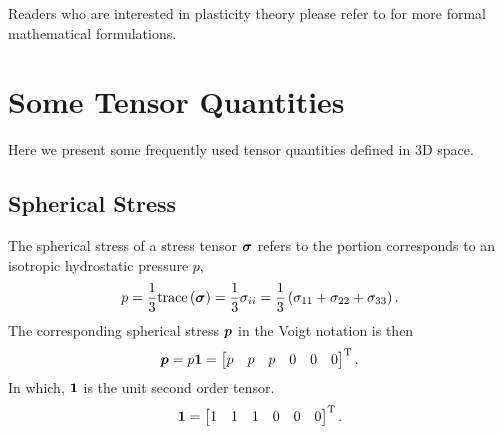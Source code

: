 Readers who are interested in plasticity theory please refer to \cite{Simo1998} for more formal mathematical formulations.
\section{Some Tensor Quantities}
Here we present some frequently used tensor quantities defined in 3D space.
\subsection{Spherical Stress}
The spherical stress of a stress tensor $\bm{\sigma}$ refers to the portion corresponds to an isotropic hydrostatic pressure $p$,
\begin{gather}
p=\dfrac{1}{3}\text{trace}\left(\bm{\sigma}\right)=\dfrac{1}{3}\sigma_{ii}=\dfrac{1}{3}\left(\sigma_{11}+\sigma_{22}+\sigma_{33}\right).
\end{gather}
The corresponding spherical stress $\bm{p}$ in the Voigt notation is then
\begin{gather}
\bm{p}=p\bm{1}=\begin{bmatrix}p&p&p&0&0&0\end{bmatrix}^{\mathrm{T}}.
\end{gather}
In which, $\bm{1}$ is the unit second order tensor.
\begin{gather}
\bm{1}=\begin{bmatrix}1&1&1&0&0&0\end{bmatrix}^{\mathrm{T}}.
\end{gather}
